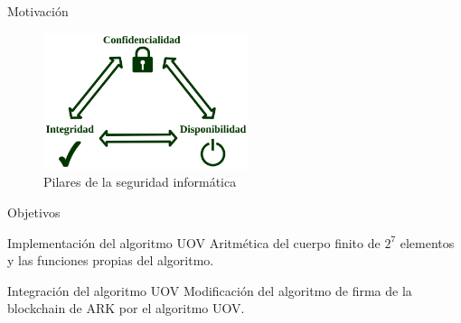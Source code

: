 \documentclass[10pt,aspectratio=169,]{beamer}
\begin{document}

\begin{frame}[c]{Motivación}
	\begin{figure}
		\centering
		\includegraphics[height=4cm]{CIA.png}
		\caption{\large{Pilares de la seguridad informática}}
	\end{figure}
\end{frame}

\begin{frame}[c]{Objetivos}
	\begin{exampleblock}{\large Implementación del algoritmo UOV}
		Aritmética del cuerpo finito de $2^7$ elementos y las funciones propias del algoritmo.
	\end{exampleblock}

	\begin{exampleblock}{\large Integración del algoritmo UOV}
		Modificación del algoritmo de firma de la blockchain de ARK por el algoritmo UOV.
	\end{exampleblock}
\end{frame}
\end{document}
